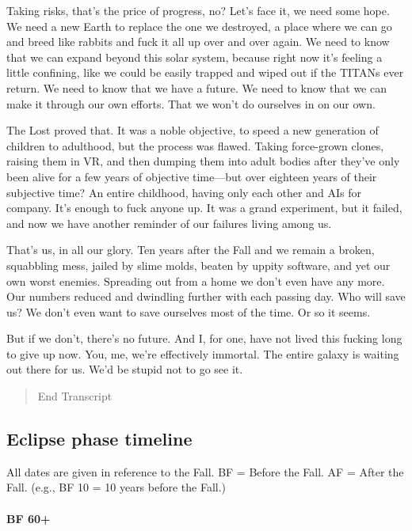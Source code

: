 Taking risks, that's the price of progress, no? Let's face it, we need
some hope. We need a new Earth to replace the one we destroyed, a
place where we can go and breed like rabbits and fuck it all up over
and over again. We need to know that we can expand beyond this solar
system, because right now it's feeling a little confining, like we
could be easily trapped and wiped out if the TITANs ever return. We
need to know that we have a future. We need to know that we can make
it through our own efforts. That we won't do ourselves in on our own.

The Lost proved that. It was a noble objective, to speed a new
generation of children to adulthood, but the process was
flawed. Taking force-grown clones, raising them in VR, and then
dumping them into adult bodies after they've only been alive for a few
years of objective time—but over eighteen years of their subjective
time? An entire childhood, having only each other and AIs for
company. It's enough to fuck anyone up. It was a grand experiment, but
it failed, and now we have another reminder of our failures living
among us.

That's us, in all our glory. Ten years after the Fall and we remain a
broken, squabbling mess, jailed by slime molds, beaten by uppity
software, and yet our own worst enemies. Spreading out from a home we
don't even have any more. Our numbers reduced and dwindling further
with each passing day. Who will save us? We don't even want to save
ourselves most of the time. Or so it seems.

But if we don't, there's no future. And I, for one, have not lived
this fucking long to give up now. You, me, we're effectively
immortal. The entire galaxy is waiting out there for us. We'd be
stupid not to go see it.

\begin{quotation}
  End Transcript
\end{quotation}

\subsection{Eclipse phase timeline}
\label{sec:eclipse-phase-timel}

All dates are given in reference to the Fall. BF = Before the Fall.
AF = After the Fall. (e.g., BF 10 = 10 years before the Fall.)
  
\paragraph{ BF 60+}

